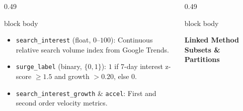 \documentclass[aspectratio=169, 10pt]{beamer}
\newenvironment{card}[1][]{%
        \begin{beamercolorbox}[rounded=true,shadow=false,wd=\linewidth,sep=3.5pt,#1]{block body}%
        \fontsize{7.8pt}{9.8pt}\selectfont%
    }{%
        \end{beamercolorbox}%
    }
\begin{document}
\begin{frame}[t]
\begin{columns}[T]
\begin{column}{0.49\textwidth}
\begin{card}
                    \begin{itemize}\setlength{\itemsep}{1.5pt}                                                                                                                                         
                        \item \texttt{search\_interest} (float, $0$--$100$): Continuous relative search volume index from Google Trends.                                                               
                        \item \texttt{surge\_label} (binary, $\{0, 1\}$): $1$ if 7-day interest z-score $\ge 1.5$ and growth $> 0.20$, else $0$.                                                       
                        \item \texttt{search\_interest\_growth} \& \texttt{accel}: First and second order velocity metrics.                                                                            
                    \end{itemize}                                                                                                                                                                      
                \end{card}                                                                                                                                                                             
            \end{column}                                                                                                                                                                               
            \begin{column}{0.49\textwidth}                                                                                                                                                             
                \begin{card}                                                                                                                                                                           
                    {\fontsize{7.5pt}{9pt}\selectfont \textbf{\color{BlueAccent}Linked Method Subsets \& Partitions}}\\[0.04cm]                                                                        
                    \begin{itemize}\setlength{\itemsep}{1.5pt}                                                                                                                                         

\end{itemize}
\end{card}
\end{column}
\end{columns}
\end{frame}
\end{document}
